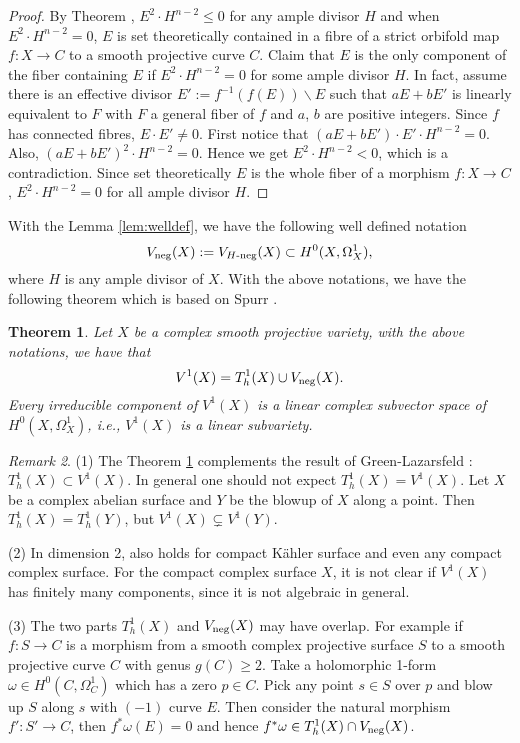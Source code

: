 \documentclass[a4paper,12pt,reqno]{amsart}
\newtheorem{theorem}{Theorem}[section]
\theoremstyle{plain}
\theoremstyle{definition}
\theoremstyle{remark}
\newtheorem{remark}[theorem]{Remark}
\begin{document}
\begin{proof}
By Theorem \cite[Theorem 2]{Sp88}, $E^2\cdot H^{n-2}\leq 0$ for any ample divisor $H$ and when $E^2\cdot H^{n-2}=0$, $E$ is set theoretically contained in a fibre of a strict orbifold map $f: X\to C$ to a smooth projective curve $C$.  Claim that $E$ is the only component of the fiber containing $E$ if $E^2\cdot H^{n-2}=0$ for some ample divisor $H$. In fact, assume there is an effective divisor $E':=f^{-1}(f(E))\backslash E$ such that $aE+bE'$ is linearly equivalent to $F$ with $F$ a general fiber of $f$ and $a$, $b$ are positive integers. Since $f$ has connected fibres, $E\cdot E'\not=0$.  First notice that $(aE+bE')\cdot E'\cdot H^{n-2}=0$. Also, $(aE+bE')^2\cdot H^{n-2}=0$. Hence we get $E^2\cdot H^{n-2}<0$, which is a contradiction. Since set theoretically $E$ is the whole fiber of a morphism $f: X\to C$, $E^2\cdot H^{n-2}=0$ for all ample divisor $H$. 
\end{proof}


With the Lemma \ref{lem:welldef}, we have the following well defined notation$$V_{\textnormal{neg}}(X):=V_{H\textnormal{-neg}}(X)\subset H^0(X, \Omega_X^1),$$ where $H$ is any ample divisor of $X$. With the above notations, we have the following theorem which is based on Spurr \cite[Theorem 2]{Sp88}.

\begin{theorem}\label{Thm:Proj-codim1}
 Let $X$ be a complex smooth projective variety, with the above notations, we have that 
$$V^1(X)= T_h^1(X)\cup V_{\textnormal{neg}}(X).
$$
Every irreducible component of $V^1(X)$ is a linear complex subvector space of $H^0(X, \Omega_X^1)$, i.e., $V^1(X)$ is a linear subvariety. %
\end{theorem}

\begin{remark} (1) The Theorem \ref{Thm:Proj-codim1} complements the result of Green-Lazarsfeld \cite{GL87}: $T_h^1(X) \subset V^1(X)$. In general one should not expect $T_h^1(X) = V^1(X)$. Let $X$ be a complex abelian surface and $Y$ be the blowup of $X$ along a point. Then $T_h^1(X)=T_h^1(Y)$, but  $V^1(X)\subsetneq V^1(Y)$.

(2) In dimension 2, \cite[Theorem 2]{Sp88} also holds for compact K\"ahler surface and even any compact complex surface. For the compact complex surface $X$, it is not clear if $V^1(X)$ has finitely many components, since it is not algebraic in general.

(3) The two parts $T_h^1(X)$ and $V_{\textnormal{neg}}(X)$ may have overlap. For example if $f: S\to C$ is a morphism from a smooth complex projective surface $S$ to a smooth projective curve $C$ with genus $g(C)\geq2$. Take a holomorphic 1-form $\omega\in H^0(C, \Omega_C^1)$ which has a zero $p\in C$. Pick any point $s\in S$ over $p$ and blow up $S$ along $s$ with $(-1)$ curve $E$. Then consider the natural morphism $f': S'\to C$, then $f^*\omega(E)=0$ and hence $f^*\omega\in T_h^1(X)\cap V_{\textnormal{neg}}(X)$.
\end{remark}
\end{document}
